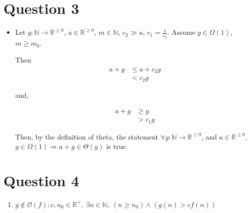 \documentclass[12pt]{article}
\begin{document}
\section*{Question 3}
\begin{itemize}
    \item

    Let $g: \mathbb{N} \to \mathbb{R}^{\geq 0}$, $a \in \mathbb{R}^{\geq 0}$,
    $m \in \mathbb{N}$, $c_2 \gg a$, $c_1 = \frac{1}{c_2}$. Assume $g \in \Omega (1)$,
    $m \geq m_0$.

    \bigskip

    Then
    \setcounter{equation}{0}
    \begin{align}
        a + g &\leq a + c_2 g\\
        &< c_2 g
    \end{align}

    and,

    \begin{align}
        a + g &\geq g\\
        &> c_1 g
    \end{align}

    \bigskip

    Then, by the definition of theta, the statement $\forall g: \mathbb{N} \to
    \mathbb{R}^{\geq 0}$, and $a \in \mathbb{R}^{\geq 0}$, $g \in \Omega(1)
    \Rightarrow a + g \in \Theta(g)$ is true.

\end{itemize}

\section*{Question 4}
\begin{enumerate}
    \item

    $g \notin \mathcal{O}(f): c,n_0 \in \mathbb{R}^{+},\:\exists n \in \mathbb{N},\:(
    n \geq n_0) \land (g(n) > cf(n))$

\end{enumerate}
\end{document}
